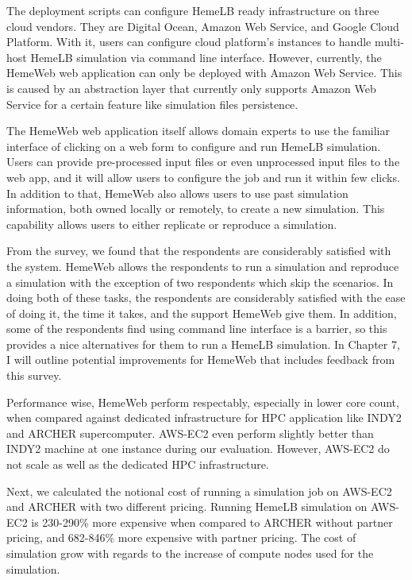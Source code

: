 The deployment scripts can configure HemeLB ready infrastructure on three cloud vendors. They are Digital Ocean, Amazon Web Service, and Google Cloud Platform. With it, users can configure cloud platform's instances to handle multi-host HemeLB simulation via command line interface. However, currently, the HemeWeb web application can only be deployed with Amazon Web Service. This is caused by an abstraction layer that currently only supports Amazon Web Service for a certain feature like simulation files persistence.

The HemeWeb web application itself allows domain experts to use the familiar interface of clicking on a web form to configure and run HemeLB simulation. Users can provide pre-processed input files or even unprocessed input files to the web app, and it will allow users to configure the job and run it within few clicks. In addition to that, HemeWeb also allows users to use past simulation information, both owned locally or remotely, to create a new simulation. This capability allows users to either replicate or reproduce a simulation.

From the survey, we found  that the respondents are considerably satisfied with the system. HemeWeb allows the respondents to run a simulation and reproduce a simulation with the exception of two respondents which skip the scenarios. In doing both of these tasks, the respondents are considerably satisfied with the ease of doing it, the time it takes, and the support HemeWeb give them. In addition, some of the respondents find using command line interface is a barrier, so this provides a nice alternatives for them to run a HemeLB simulation. In Chapter 7, I will outline potential improvements for HemeWeb that includes feedback from this survey.

Performance wise, HemeWeb perform respectably, especially in lower core count, when compared against dedicated infrastructure for HPC application like INDY2 and ARCHER supercomputer. AWS-EC2 even perform slightly better than INDY2 machine at one instance during our evaluation. However, AWS-EC2 do not scale as well as the dedicated HPC infrastructure.

Next, we calculated the notional cost of running a simulation job on AWS-EC2 and ARCHER with two different pricing. Running HemeLB simulation on AWS-EC2 is 230-290\% more expensive when compared to ARCHER without partner pricing, and 682-846\% more expensive with partner pricing. The cost of simulation grow with regards to the increase of compute nodes used for the simulation. 

